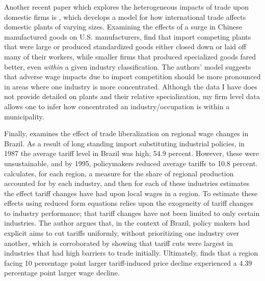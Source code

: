\documentclass[12pt]{article}
\begin{document}
Another recent paper which explores the heterogeneous impacts of trade upon domestic firms is 
\citet{holmes1}, which develops a model for how international trade affects domestic plants of varying sizes. 
Examining the effects of a surge in Chinese manufactured goods on U.S. manufacturers,
\citeauthor{holmes1} find that import competing plants that were large or produced standardized goods 
either closed down or laid off many of their workers, while smaller firms that produced specialized 
goods fared better, even \textit{within} a given industry classification. The authors' 
model suggests that adverse wage impacts due to import competition should be more pronounced in 
areas where one industry is more concentrated. Although the data I have does not provide detailed
on plants and their relative specialization, my firm level data allows one to infer how concentrated an
industry/occupation is within a municipality.

Finally, \citet{kovak}  examines 
the effect of trade liberalization on regional wage changes in Brazil. As a result of long standing
import substituting industrial policies, in 1987 the average tariff level in Brazil was high; 
54.9 percent. However, these were unsustainable, and by 1995, policymakers reduced average tariffs 
to 10.8 percent. \citeauthor{kovak} calculates, for each region, a measure for the share of regional production 
accounted for by each industry, and then for each of these industries estimates the effect tariff 
changes have had upon local wages in a region. 
To estimate these effects using reduced form equations relies upon the exogeneity of tariff changes to 
industry performance; that tariff changes have not been limited to only certain industries. 
The author argues that, in the context of Brazil, policy makers had explicit aims to cut tariffs 
uniformly, without prioritizing one industry over another, which is corroborated by showing that 
tariff cuts were largest in industries that had high barriers to trade initially.
Ultimately, \citeauthor{kovak} finds that a region facing 10 percentage point larger tariff-induced 
price decline experienced a 4.39 percentage point larger wage decline.

\vspace{-10pt}
\end{document}
